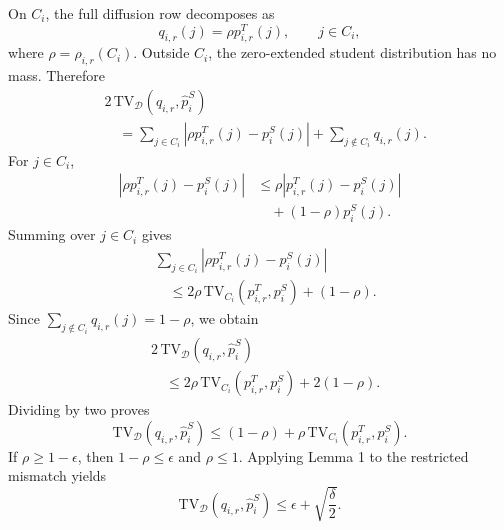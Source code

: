 On $C_i$, the full diffusion row decomposes as
\begin{equation}
    q_{i,r}(j)=\rho p^T_{i,r}(j),
    \qquad j\in C_i,
\end{equation}
where $\rho=\rho_{i,r}(C_i)$. Outside $C_i$, the zero-extended student distribution has no mass. Therefore
\begin{equation}
\begin{aligned}
&2\,\mathrm{TV}_{\mathcal{D}}
\left(q_{i,r},\widehat p_i^S\right)\\
&\quad=
\sum_{j\in C_i}
\left|\rho p^T_{i,r}(j)-p_i^S(j)\right|
+
\sum_{j\notin C_i}q_{i,r}(j).
\end{aligned}
\end{equation}
For $j\in C_i$,
\begin{equation}
\begin{aligned}
    \left|\rho p^T_{i,r}(j)-p_i^S(j)\right|
    &\le
    \rho\left|p^T_{i,r}(j)-p_i^S(j)\right|\\
    &\quad +(1-\rho)p_i^S(j).
\end{aligned}
\end{equation}
Summing over $j\in C_i$ gives
\begin{equation}
\begin{aligned}
&\sum_{j\in C_i}
\left|\rho p^T_{i,r}(j)-p_i^S(j)\right|\\
&\quad\le
2\rho\,\mathrm{TV}_{C_i}(p^T_{i,r},p_i^S)
+(1-\rho).
\end{aligned}
\end{equation}
Since $\sum_{j\notin C_i}q_{i,r}(j)=1-\rho$, we obtain
\begin{equation}
\begin{aligned}
&2\,\mathrm{TV}_{\mathcal{D}}
\left(q_{i,r},\widehat p_i^S\right)\\
&\quad\le
2\rho\,\mathrm{TV}_{C_i}(p^T_{i,r},p_i^S)
+2(1-\rho).
\end{aligned}
\end{equation}
Dividing by two proves
\begin{equation}
    \mathrm{TV}_{\mathcal{D}}\left(q_{i,r},\widehat p_i^S\right)
    \le
    (1-\rho)
    +
    \rho\,\mathrm{TV}_{C_i}\left(p^T_{i,r},p_i^S\right).
\end{equation}
If $\rho\ge 1-\epsilon$, then $1-\rho\le\epsilon$ and $\rho\le 1$. Applying Lemma 1 to the restricted mismatch yields
\begin{equation}
    \mathrm{TV}_{\mathcal{D}}\left(q_{i,r},\widehat p_i^S\right)
    \le
    \epsilon + \sqrt{\frac{\delta}{2}}.
\end{equation}

